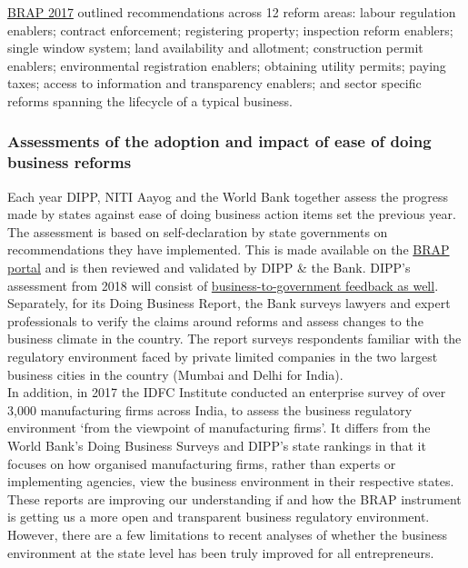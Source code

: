 \documentclass[a4paper, 12pt, twoside]{article}
\begin{document}
\href{http://eodb.dipp.gov.in/World\%20Bank\%20Orientation\%20Workshop.pdf}{BRAP 2017} outlined recommendations across 12 reform areas: labour regulation enablers; contract enforcement; registering property; inspection reform enablers; single window system; land availability and allotment; construction permit enablers; environmental registration enablers; obtaining utility permits; paying taxes; access to information and transparency enablers; and sector specific reforms spanning the lifecycle of a typical business.

\subsubsection*{Assessments of the adoption and impact of ease of doing business reforms}    

Each year DIPP, NITI Aayog and the World Bank together assess the progress made by states against ease of doing business action items set the previous year. The assessment is based on self-declaration by state governments on recommendations they have implemented. This is made available on the \href{http://eodb.dipp.gov.in}{BRAP portal} and is then reviewed and validated by DIPP \& the Bank. DIPP’s assessment from 2018 will consist of \href{http://eodb.dipp.gov.in/Note\%20on
\%20Feedback\%20methodology.pdf}{business-to-government feedback as well}. \\

Separately, for its Doing Business Report, the Bank surveys lawyers and expert professionals to verify the claims around reforms and assess changes to the business climate in the country. The report surveys respondents familiar with the regulatory environment faced by private limited companies in the two largest business cities in the country (Mumbai and Delhi for India). \\ 

In addition, in 2017 the IDFC Institute conducted an enterprise survey of over 3,000 manufacturing firms across India, to assess the business regulatory environment ‘from the viewpoint of manufacturing firms’. It differs from the World Bank’s Doing Business Surveys and DIPP’s state rankings in that it focuses on how organised manufacturing firms, rather than experts or implementing agencies, view the business environment in their respective states. \\

These reports are improving our understanding if and how the BRAP instrument is getting us a more open and transparent business regulatory environment. However, there are a few limitations to recent analyses of whether the business environment at the state level has been truly improved for all entrepreneurs.
\end{document}
